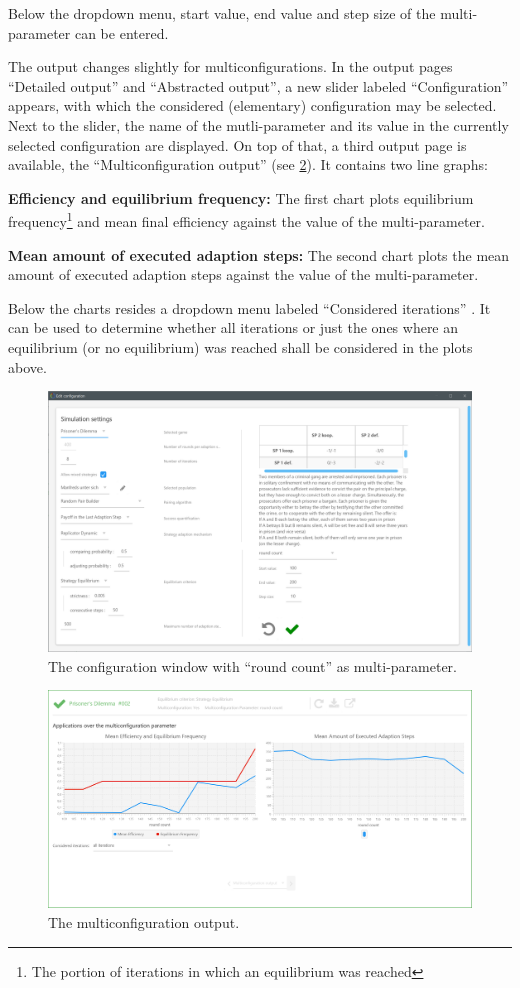 \documentclass[parskip=full,11pt]{scrartcl}
\newcommand*\circled[1]{\tikz[baseline=(char.base)]{
            \node[shape=circle,draw,inner sep=2pt] (char) {#1};}}
\begin{document}
Below the dropdown menu, start value, end value and step size of the multi-parameter can be entered.

The output changes slightly for multiconfigurations. In the output pages \enquote{Detailed output} and \enquote{Abstracted output}, a new slider labeled \enquote{Configuration} appears, with which the considered (elementary) configuration may be selected. Next to the slider, the name of the mutli-parameter and its value in the currently selected configuration are displayed. On top of that, a third output page is available, the \enquote{Multiconfiguration output} (see \ref{fig:multi_ouput}). It contains two line graphs:

\textbf{Efficiency and equilibrium frequency:} The first chart plots equilibrium frequency\footnote{The portion of iterations in which an equilibrium was reached} and mean final efficiency against the value of the multi-parameter.

\textbf{Mean amount of executed adaption steps:} The second chart plots the mean amount of executed adaption steps against the value of the multi-parameter.

Below the charts resides a dropdown menu labeled \enquote{Considered iterations} \circled{4}. It can be used to determine whether all iterations or just the ones where an equilibrium (or no equilibrium) was reached shall be considered in the plots above.

\begin{figure}
	\centering
	\includegraphics[width=0.7\linewidth]{img_manual/multiparam_configwindow.PNG}
	\caption{The configuration window with \enquote{round count} as multi-parameter.}
	\label{fig:multi_config}
\end{figure}

\begin{figure}
	\centering
	\includegraphics[width=0.7\linewidth]{img_manual/Multiconfiguration_output.PNG}
	\caption{The multiconfiguration output.}
	\label{fig:multi_ouput}
\end{figure}
\end{document}
